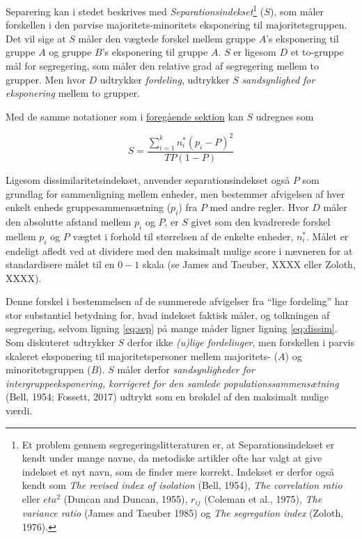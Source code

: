 \documentclass[
]{book}
\begin{document}
Separering kan i stedet beskrives med \emph{Separationsindekset}\footnote{Et problem gennem segregeringslitteraturen er, at Separationsindekset er kendt under mange navne, da metodiske artikler ofte har valgt at give indekset et nyt navn, som de finder mere korrekt. Indekset er derfor også kendt som \emph{The revised index of isolation} (Bell, 1954), \emph{The correlation ratio} eller \(eta^{2}\) (Duncan and Duncan, 1955), \(r_{ij}\) (Coleman et al., 1975), \emph{The variance ratio} (James and Taeuber 1985) og \emph{The segregation index} (Zoloth, 1976).} (\(S\)), som måler forskellen i den parvise majoritets-minoritets eksponering til majoritetsgruppen. Det vil sige at \(S\) måler den vægtede forskel mellem gruppe \(A\)'s eksponering til gruppe \(A\) og gruppe \(B\)'s eksponering til gruppe \(A\). \(S\) er ligesom \(D\) et to-gruppe mål for segregering, som måler den relative grad af segregering mellem to grupper. Men hvor \(D\) udtrykker \emph{fordeling}, udtrykker \(S\) \emph{sandsynlighed for eksponering} mellem to grupper.

Med de samme notationer som i \hyperref[dissimkap]{foregående sektion} kan \(S\) udregnes som

\begin{equation}
\label{eq:sep}
S = \frac{{\textstyle \sum_{i=1}^{k}} n_{i}^{*} \left ( p_{i}-P \right )^{2} }{ TP \left ( 1-P \right ) } 
\end{equation}

Ligesom dissimilaritetsindekset, anvender separationsindekset også \(P\) som grundlag for sammenligning mellem enheder, men bestemmer afvigelsen af hver enkelt enheds gruppesammensætning (\(p_{i}\)) fra \(P\) med andre regler. Hvor \(D\) måler den absolutte afstand mellem \(p_{i}\) og \(P\), er \(S\) givet som den kvadrerede forskel mellem \(p_{i}\) og \(P\) vægtet i forhold til størrelsen af de enkelte enheder, \(n_{i}^{*}\). Målet er endeligt afledt ved at dividere med den maksimalt mulige score i nævneren for at standardisere målet til en \(0-1\) skala (se James and Taeuber, XXXX eller Zoloth, XXXX).

Denne forskel i bestemmelsen af de summerede afvigelser fra ``lige fordeling'' har stor substantiel betydning for, hvad indekset faktisk måler, og tolkningen af segregering, selvom ligning \eqref{eq:sep} på mange måder ligner ligning \eqref{eq:dissim}. Som diskuteret udtrykker \(S\) derfor ikke \emph{(u)lige fordelinger}, men forskellen i parvis skaleret eksponering til majoritetspersoner mellem majoritets- (\(A\)) og minoritetsgruppen (\(B\)). \(S\) måler derfor \emph{sandsynligheder for intergruppeeksponering, korrigeret for den samlede populationssammensætning} (Bell, 1954; Fossett, 2017) udtrykt som en brøkdel af den maksimalt mulige værdi.
\end{document}
